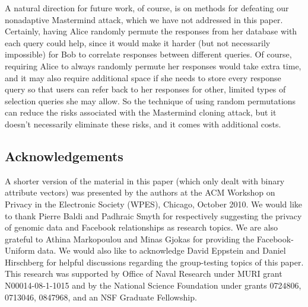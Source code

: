 \documentclass{article}
\begin{document}
A natural direction for future work, of course, is on methods for
defeating our nonadaptive Mastermind attack, which we have not addressed in this paper.
Certainly, having Alice randomly permute the responses from her database 
with each query could help, since it would make it harder (but not
necessarily impossible) for Bob to correlate responses between
different queries. Of course, requiring Alice to always randomly permute
her responses would take extra time, and it may also require
additional space if she needs to store every response query so that
users can refer back to her responses for other, limited types of selection
queries she may allow.
So the technique of using random permutations can reduce the
risks associated with the Mastermind cloning attack, but it doesn't
necessarily eliminate these risks, and it comes with additional costs.

\subsection*{Acknowledgements}
A shorter version of the material in this paper (which only dealt with binary 
attribute vectors) was presented by the authors at
the ACM Workshop on Privacy in the Electronic Society (WPES), Chicago, October 2010.
We would like to thank Pierre Baldi and Padhraic Smyth for respectively 
suggesting the privacy of genomic data and Facebook relationships as research topics.
We are also grateful to Athina Markopoulou and Minas Gjokas for providing the Facebook-Uniform data.
We would also like to acknowledge David Eppstein and Daniel Hirschberg
for helpful discussions regarding the group-testing topics of this paper.
This research was supported by Office of Naval Research under MURI grant N00014-08-1-1015 and
by the National Science Foundation under grants 0724806, 0713046, 0847968, and an NSF Graduate Fellowship. 




\end{document}
